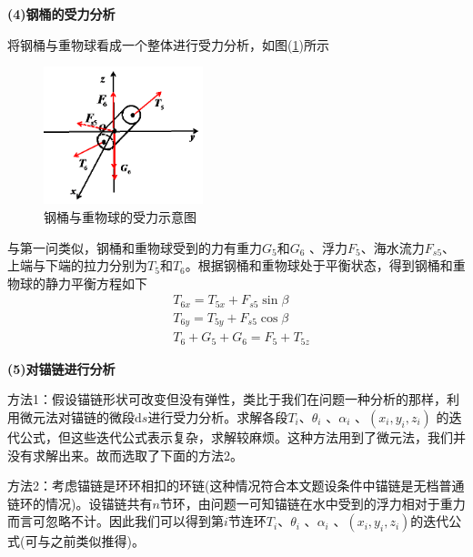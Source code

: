             \par
            \textbf{(4)钢桶的受力分析}
            \par
            将钢桶与重物球看成一个整体进行受力分析，如图(\ref{钢桶与重物球的受力示意图})所示
            \begin{figure}[H]
            \centering
            \includegraphics[height=4cm]{images/Steel_pipe_and_weight_ball_force.jpg}
            \caption{钢桶与重物球的受力示意图}
            \label{钢桶与重物球的受力示意图}
            \end{figure}
            \par
            与第一问类似，钢桶和重物球受到的力有重力$G_5$和$G_6$ 、浮力$F_5$、海水流力$F_{s5}$、上端与下端的拉力分别为$T_5$和$T_6$。根据钢桶和重物球处于平衡状态，得到钢桶和重物球的静力平衡方程如下
            \begin{align*}
            & T_{6x} = T_{5x}+F_{s5}\sin \beta\\
            & T_{6y} = T_{5y}+F_{s5}\cos \beta\\
            & T_6 + G_5+G_6 = F_5+T_{5z}
            \end{align*}
            \par
            \textbf{(5)对锚链进行分析}
            \par
            方法1：假设锚链形状可改变但没有弹性，类比于我们在问题一种分析的那样，利用微元法对锚链的微段$\mathrm{d}s$进行受力分析。求解各段$T_i$、$\theta_i$ 、$\alpha_i$ 、$(x_i,y_i,z_i)$ 的迭代公式，但这些迭代公式表示复杂，求解较麻烦。这种方法用到了微元法，我们并没有求解出来。故而选取了下面的方法2。
            \par
            方法2：考虑锚链是环环相扣的环链(这种情况符合本文题设条件中锚链是无档普通链环的情况)。设锚链共有$n$节环，由问题一可知锚链在水中受到的浮力相对于重力而言可忽略不计。因此我们可以得到第$i$节连环$T_i$、$\theta_i$ 、$\alpha_i$ 、$(x_i,y_i,z_i)$的迭代公式(可与之前类似推得)。
